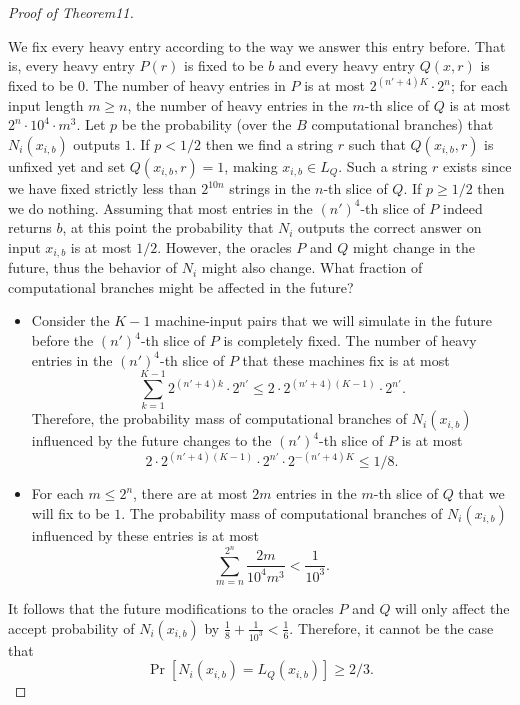 \begin{proof}[Proof of Theorem11]
\begin{itemize}
\end{itemize}
We fix every heavy entry according to the way we answer this entry before. That is, every heavy entry $P(r)$ is fixed to be $b$ and every heavy entry $Q(x,r)$ is fixed to be $0$. The number of heavy entries in $P$ is at most $2^{(n'+4)K}\cdot2^n$; for each input length $m\geq n$, the number of heavy entries in the $m$-th slice of $Q$ is at most $2^n\cdot10^4\cdot m^3$.
Let $p$ be the probability (over the $B$ computational branches) that $N_i(x_{i,b})$ outputs $1$. If $p<1/2$ then we find a string $r$ such that $Q(x_{i,b},r)$ is unfixed yet and set $Q(x_{i,b},r)=1$, making $x_{i,b}\in L_Q$. Such a string $r$ exists since we have fixed strictly less than $2^{10n}$ strings in the $n$-th slice of $Q$. If $p\geq1/2$ then we do nothing.
Assuming that most entries in the $(n')^4$-th slice of $P$ indeed returns $b$, at this point the probability that $N_i$ outputs the correct answer on input $x_{i,b}$ is at most $1/2$. However, the oracles $P$ and $Q$ might change in the future, thus the behavior of $N_i$ might also change. What fraction of computational branches might be affected in the future?
\begin{itemize}
\item Consider the $K-1$ machine-input pairs that we will simulate in the future before the $(n')^4$-th slice of $P$ is completely fixed. The number of heavy entries in the $(n')^4$-th slice of $P$ that these machines fix is at most
\[\sum_{k=1}^{K-1}2^{(n'+4)k}\cdot2^{n'}\leq2\cdot2^{(n'+4)(K-1)}\cdot2^{n'}.\]
Therefore, the probability mass of computational branches of $N_i(x_{i,b})$ influenced by the future changes to the $(n')^4$-th slice of $P$ is at most
\[2\cdot2^{(n'+4)(K-1)}\cdot2^{n'}\cdot2^{-(n'+4)K}\leq1/8.\]
\item For each $m\leq2^n$, there are at most $2m$ entries in the $m$-th slice of $Q$ that we will fix to be $1$. The probability mass of computational branches of $N_i(x_{i,b})$ influenced by these entries is at most
\[\sum_{m=n}^{2^n}\frac{2m}{10^4m^3}<\frac{1}{10^3}.\]
\end{itemize}
It follows that the future modifications to the oracles $P$ and $Q$ will only affect the accept probability of $N_i(x_{i,b})$ by $\frac18+\frac{1}{10^3}<\frac16$. Therefore, it cannot be the case that
\[\Pr[N_i(x_{i,b})=L_Q(x_{i,b})]\geq2/3.\]

\end{proof}
